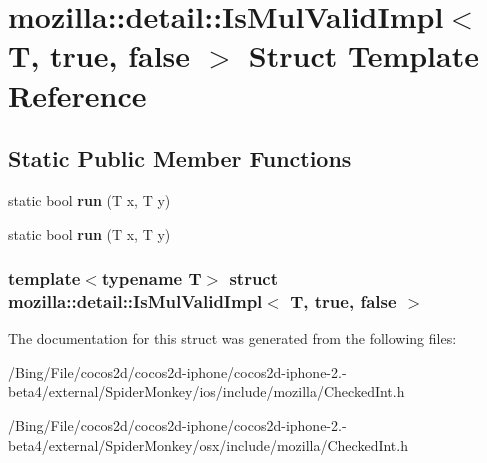 \hypertarget{structmozilla_1_1detail_1_1_is_mul_valid_impl_3_01_t_00_01true_00_01false_01_4}{\section{mozilla\-:\-:detail\-:\-:Is\-Mul\-Valid\-Impl$<$ T, true, false $>$ Struct Template Reference}
\label{structmozilla_1_1detail_1_1_is_mul_valid_impl_3_01_t_00_01true_00_01false_01_4}
}
\subsection*{Static Public Member Functions}
\begin{DoxyCompactItemize}
\item 
\hypertarget{structmozilla_1_1detail_1_1_is_mul_valid_impl_3_01_t_00_01true_00_01false_01_4_ab53e34aa4c2a356fe732b513755fe8e9}{static bool {\bfseries run} (T x, T y)}\label{structmozilla_1_1detail_1_1_is_mul_valid_impl_3_01_t_00_01true_00_01false_01_4_ab53e34aa4c2a356fe732b513755fe8e9}

\item 
\hypertarget{structmozilla_1_1detail_1_1_is_mul_valid_impl_3_01_t_00_01true_00_01false_01_4_ab53e34aa4c2a356fe732b513755fe8e9}{static bool {\bfseries run} (T x, T y)}\label{structmozilla_1_1detail_1_1_is_mul_valid_impl_3_01_t_00_01true_00_01false_01_4_ab53e34aa4c2a356fe732b513755fe8e9}

\end{DoxyCompactItemize}
\subsubsection*{template$<$typename T$>$ struct mozilla\-::detail\-::\-Is\-Mul\-Valid\-Impl$<$ T, true, false $>$}



The documentation for this struct was generated from the following files\-:\begin{DoxyCompactItemize}
\item 
/\-Bing/\-File/cocos2d/cocos2d-\/iphone/cocos2d-\/iphone-\/2.-\/beta4/external/\-Spider\-Monkey/ios/include/mozilla/Checked\-Int.\-h\item 
/\-Bing/\-File/cocos2d/cocos2d-\/iphone/cocos2d-\/iphone-\/2.-\/beta4/external/\-Spider\-Monkey/osx/include/mozilla/Checked\-Int.\-h\end{DoxyCompactItemize}
